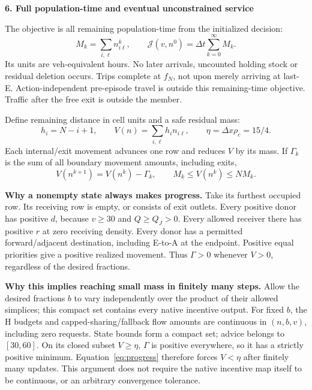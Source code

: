 \documentclass[10pt,a4paper]{article}
\newcommand{\head}[1]{\par\medskip\textbf{#1}\par}
\begin{document}
\newpage
\head{6. Full population-time and eventual unconstrained service}
The objective is all remaining population-time from the initialized decision:
\begin{equation}
 M_k=\sum_{i,\ell}n^k_{i\ell},\qquad
 \mathcal J(v,n^0)=\Delta t\sum_{k=0}^{\infty}M_k. \label{eq:J}
\end{equation}
Its units are veh-equivalent hours. No later arrivals, uncounted holding
stock or residual deletion occurs. Trips complete at $f_N$, not upon merely
arriving at last-E. Action-independent pre-episode travel is outside this
remaining-time objective. Traffic after the free exit is outside the member.

Define remaining distance in cell units and a safe residual mass:
\begin{equation}
 h_i=N-i+1,\qquad V(n)=\sum_{i,\ell}h_i n_{i\ell},\qquad
 \eta=\Delta x\rho_c=15/4. \label{eq:potential}
\end{equation}
Each internal/exit movement advances one row and reduces $V$ by its mass.
If $\Gamma_k$ is the sum of all boundary movement amounts, including exits,
\begin{equation}
 V(n^{k+1})=V(n^k)-\Gamma_k,\qquad M_k\leq V(n^k)\leq N M_k.
 \label{eq:progress}
\end{equation}

\textbf{Why a nonempty state always makes progress.} Take its furthest
occupied row. Its receiving row is empty, or consists of exit outlets.
Every positive donor has positive $d$, because $v\geq30$ and $Q\geq Q_J>0$.
Every allowed receiver there has positive $r$ at zero receiving density.
Every donor has a permitted forward/adjacent destination, including E-to-A
at the endpoint. Positive equal priorities give a positive realized movement.
Thus $\Gamma>0$ whenever $V>0$, regardless of the desired fractions.

\textbf{Why this implies reaching small mass in finitely many steps.}
Allow the desired fractions $b$ to vary independently over the product of
their allowed simplices; this compact set contains every native incentive
output. For fixed $b$, the H budgets and capped-sharing/fallback flow amounts
are continuous in $(n,b,v)$, including zero requests. State bounds form a
compact set; advice belongs to $[30,60]$. On its closed subset $V\geq\eta$,
$\Gamma$ is positive everywhere, so it has a strictly positive minimum.
Equation~\eqref{eq:progress} therefore forces $V<\eta$ after finitely many
updates. This argument does not require the native incentive map itself to
be continuous, or an arbitrary convergence tolerance.
\end{document}
